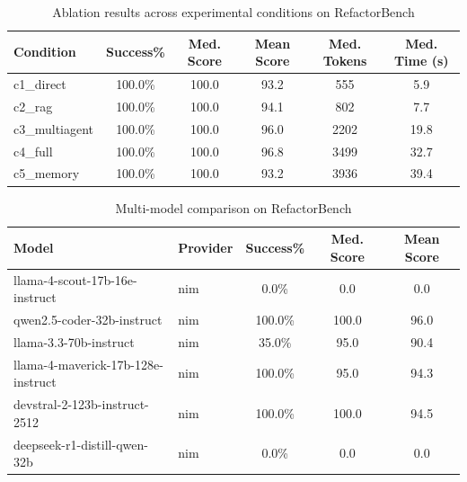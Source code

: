 \begin{table}[h]
\centering
\caption{Ablation results across experimental conditions on RefactorBench}
\small
\begin{tabular}{@{}lccccc@{}}
\toprule
\textbf{Condition} & \textbf{Success\%} & \textbf{Med. Score} & \textbf{Mean Score} & \textbf{Med. Tokens} & \textbf{Med. Time (s)} \\
\midrule
c1_direct & 100.0\% & 100.0 & 93.2 & 555 & 5.9 \\
c2_rag & 100.0\% & 100.0 & 94.1 & 802 & 7.7 \\
c3_multiagent & 100.0\% & 100.0 & 96.0 & 2202 & 19.8 \\
c4_full & 100.0\% & 100.0 & 96.8 & 3499 & 32.7 \\
c5_memory & 100.0\% & 100.0 & 93.2 & 3936 & 39.4 \\
\bottomrule
\end{tabular}
\end{table}

\begin{table}[h]
\centering
\caption{Multi-model comparison on RefactorBench}
\small
\begin{tabular}{@{}llccc@{}}
\toprule
\textbf{Model} & \textbf{Provider} & \textbf{Success\%} & \textbf{Med. Score} & \textbf{Mean Score} \\
\midrule
llama-4-scout-17b-16e-instruct & nim & 0.0\% & 0.0 & 0.0 \\
qwen2.5-coder-32b-instruct & nim & 100.0\% & 100.0 & 96.0 \\
llama-3.3-70b-instruct & nim & 35.0\% & 95.0 & 90.4 \\
llama-4-maverick-17b-128e-instruct & nim & 100.0\% & 95.0 & 94.3 \\
devstral-2-123b-instruct-2512 & nim & 100.0\% & 100.0 & 94.5 \\
deepseek-r1-distill-qwen-32b & nim & 0.0\% & 0.0 & 0.0 \\
\bottomrule
\end{tabular}
\end{table}